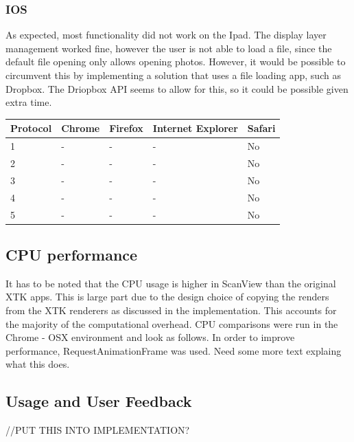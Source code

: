 \documentclass[a4paper,11pt,titlepage]{article}
\begin{document}
\subsubsection*{IOS}

As expected, most functionality did not work on the Ipad. The display layer management worked fine, however the user is not able to load a file, since the default file opening only allows opening photos. However, it would be possible to circumvent this by implementing a solution that uses a file loading app, such as Dropbox. The Driopbox API seems to allow for this, so it could be possible given extra time.

\begin{center}

  \begin{tabular}{ | l || l | l | l | l |}
    \hline
    Protocol & Chrome & Firefox & Internet Explorer & Safari \\ \hline \hline
    1 & - & -  & -  & No \\ \hline
    2 & - & - & - & No \\ \hline
    3 & - & - & - & No \\ \hline
    4 & - & - & - & No \\ \hline
    5 & - & - & - & No \\
    \hline
  \end{tabular}

\end{center}


\subsection{CPU performance}

It has to be noted that the CPU usage is higher in ScanView than the original XTK apps. This is large part due to the design choice of copying the renders from the XTK renderers as discussed in the implementation. This accounts for the majority of the computational overhead. CPU comparisons were run in the Chrome - OSX environment and look as follows.
In order to improve performance, RequestAnimationFrame was used. Need some more text explaing what this does.



\subsection{Usage and User Feedback}

//PUT THIS INTO IMPLEMENTATION?
\end{document}
